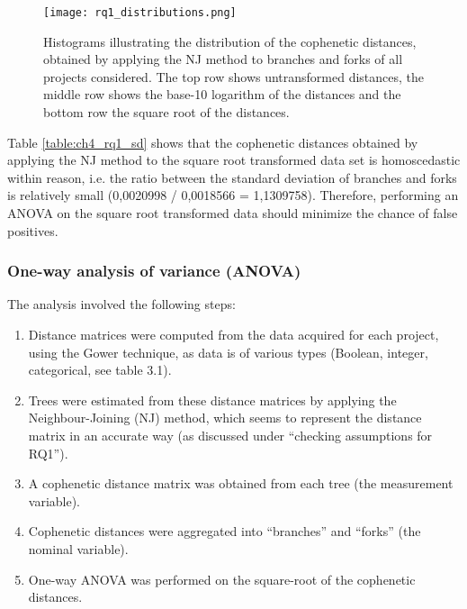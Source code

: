 \begin{figure}[H]
  \centering
  \texttt{[image: rq1\_distributions.png]}
  \caption{Histograms illustrating the distribution of the cophenetic distances, obtained by applying the NJ method to branches and forks of all projects considered. The top row shows untransformed distances, the middle row shows the base-10 logarithm of the distances and the bottom row the square root of the distances.}
  \label{fig:rq1_distributions}
\end{figure}

 Table \ref{table:ch4_rq1_sd} shows that the cophenetic distances obtained by applying the NJ method to the square root transformed data set is homoscedastic within reason, i.e. the ratio between the standard deviation of branches and forks is relatively small (0,0020998 /  0,0018566 = 1,1309758). Therefore, performing an ANOVA on the square root transformed data should minimize the chance of false positives.



\subsubsection{One-way analysis of variance (ANOVA)}
The analysis involved the following steps:

\begin{enumerate}
\item{Distance matrices were computed from the data acquired for each project, using the Gower technique, as data is of various types (Boolean, integer, categorical, see table 3.1).}

\item{Trees were estimated from these distance matrices by applying the Neighbour-Joining (NJ) method, which seems to represent the distance matrix in an accurate way (as discussed under “checking assumptions for RQ1”).}
  
\item{A cophenetic distance matrix was obtained from each tree (the measurement variable).}
  
\item{Cophenetic distances were aggregated into “branches” and “forks” (the nominal variable).}

\item{One-way ANOVA was performed on the square-root of the cophenetic distances.}
\end{enumerate}

